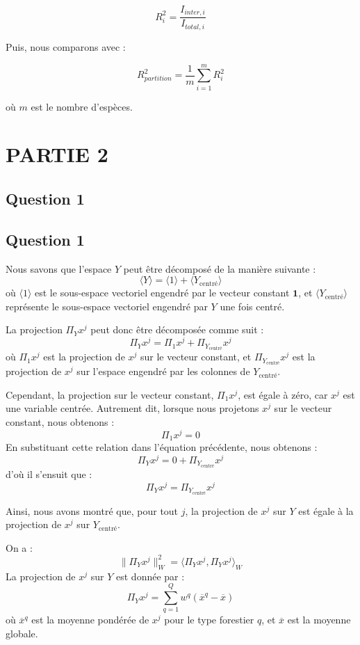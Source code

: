 \documentclass[a4paper,12pt]{article}
\begin{document}
\[
R^2_{i} = \frac{I_{inter,i}}{I_{total,i}}
\]

Puis, nous comparons avec :

\[
R^2_{partition} = \frac{1}{m} \sum_{i=1}^{m} R^2_{i}
\]

où \( m \) est le nombre d'espèces.

\section{PARTIE 2}
\subsection{Question 1}
\subsection{Question 1}
Nous savons que l’espace \( Y \) peut être décomposé de la manière suivante :
\[
\langle Y \rangle = \langle 1 \rangle + \langle Y_{\text{centré}} \rangle
\]
où \( \langle 1 \rangle \) est le sous-espace vectoriel engendré par le vecteur constant \( \mathbf{1} \), et \( \langle Y_{\text{centré}} \rangle \) représente le sous-espace vectoriel engendré par \( Y \) une fois centré.

La projection \( \Pi_Y x^j \) peut donc être décomposée comme suit :
\[
\Pi_Y x^j = \Pi_1 x^j + \Pi_{Y_{\text{centré}}} x^j
\]
où \( \Pi_1 x^j \) est la projection de \( x^j \) sur le vecteur constant, et \( \Pi_{Y_{\text{centré}}} x^j \) est la projection de \( x^j \) sur l’espace engendré par les colonnes de \( Y_{\text{centré}} \).

Cependant, la projection sur le vecteur constant, \( \Pi_1 x^j \), est égale à zéro, car \( x^j \) est une variable centrée. Autrement dit, lorsque nous projetons \( x^j \) sur le vecteur constant, nous obtenons :
\[
\Pi_1 x^j = 0
\]
En substituant cette relation dans l’équation précédente, nous obtenons :
\[
\Pi_Y x^j = 0 + \Pi_{Y_{\text{centré}}} x^j
\]
d’où il s’ensuit que :
\[
\Pi_Y x^j = \Pi_{Y_{\text{centré}}} x^j
\]

Ainsi, nous avons montré que, pour tout \( j \), la projection de \( x^j \) sur \( Y \) est égale à la projection de \( x^j \) sur \( Y_{\text{centré}} \).\newline

On a :
\[
\| \Pi_Y x^j \|_W^2 = \langle \Pi_Y x^j, \Pi_Y x^j \rangle_W
\]
La projection de \( x^j \) sur \( Y \) est donnée par :
\[
\Pi_Y x^j = \sum_{q=1}^{Q} w^q (\overline{x}^q - \overline{x})
\]
où \( \overline{x}^q \) est la moyenne pondérée de \( x^j \) pour le type forestier \( q \), et \( \overline{x} \) est la moyenne globale.
\end{document}

